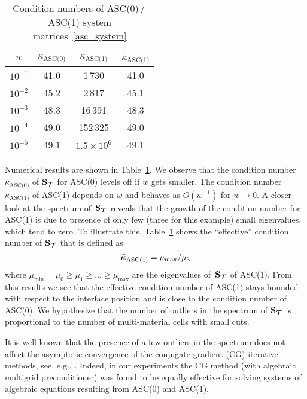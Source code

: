\begin{table}[h]
	\centering
	\caption{Condition numbers of ASC(0)\,/\,ASC(1) system matrices~\eqref{asc_system} \label{fig:w:res}}
	\begin{tabular}[1.2]{ | c | c | c | c |}
		\hline
		$w$ & $\kappa_{\text{ASC(0)}}$ & $\kappa_{\text{ASC(1)}}$ & $\widetilde\kappa_{\text{ASC(1)}}$\\
		\hline
		$10^{-1}$ & 41.0 & 1\,730       & 41.0  \\
		\hline
		$10^{-2}$ & 45.2 & 2\,817       & 45.1  \\
		\hline
		$10^{-3}$ & 48.3 & 16\,391      & 48.3   \\
		\hline
		$10^{-4}$ & 49.0 & 152\,325     & 49.0    \\
		\hline
		$10^{-5}$ & 49.1 & $1.5\times10^6$&49.1  \\
		\hline
	\end{tabular}%
\end{table}

Numerical results are shown in Table~\ref{fig:w:res}. We observe that the condition number~$\kappa_{\text{ASC(0)}}$ of $\boldsymbol{\mathbf{S}}_{\boldsymbol{\mathbf{\mathcal T}}}$ for ASC(0) levels off if $w$ gets smaller. The condition number~$\kappa_{\text{ASC(1)}}$ of ASC(1) depends on $w$ and behaves as $O(w^{-1})$ for $w\to0$. A closer look at the spectrum of~$\boldsymbol{\mathbf{S}}_{\boldsymbol{\mathbf{\mathcal T}}}$ reveals that the growth of the condition number for ASC(1) is due to presence of only few (three for this example) small eigenvalues, which tend to zero. To illustrate this, Table~\ref{fig:w:res} shows the ``effective'' condition number of $\boldsymbol{\mathbf{S}}_{\boldsymbol{\mathbf{\mathcal T}}}$ that is defined as
$$
	\widetilde{\boldsymbol{\mathbf{\kappa}}}_{\text{ASC(1)}} = {\mu_{\text{max}}}/{\mu_3}
$$
where $\mu_{\text{min}} = \mu_0 \ge \mu_1 \ge \dots \ge \mu_{\text{max}}$ are the eigenvalues of~$\boldsymbol{\mathbf{S}}_{\boldsymbol{\mathbf{\mathcal T}}}$ of ASC(1). From this results we see that the effective condition number of ASC(1) stays bounded with respect to the interface position and is  close to the condition number of ASC(0). We hypothesize that the number of outliers in the  spectrum of $\boldsymbol{\mathbf{S}}_{\boldsymbol{\mathbf{\mathcal T}}}$ is proportional to the number of multi-material cells with small cuts.
	
It is well-known that the presence of a few outliers in the spectrum does not affect the asymptotic convergence of the conjugate gradient (CG) iterative methods, see, e.g., \cite{olshanskii2014iterative}. Indeed, in our experiments the CG method (with algebraic multigrid preconditioner) was found to be equally effective for solving systems of algebraic equations resulting from ASC(0) and ASC(1).
	
